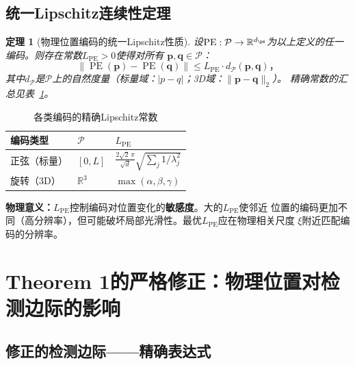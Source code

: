 \documentclass[11pt,a4paper]{article}
\newtheorem{theorem}{定理}[section]
\theoremstyle{remark}
\DeclareMathOperator{\PE}{PE}
\newcommand{\R}{\mathbb{R}}
\newcommand{\Ppos}{\mathcal{P}}
\begin{document}
\subsection{统一Lipschitz连续性定理}

\begin{theorem}[物理位置编码的统一Lipschitz性质]
\label{thm:1.4.1}
设$\PE: \Ppos \to \R^{d_{\pe}}$为以上定义的任一编码。则存在常数$L_{\PE} > 0$使得对所有
$\mathbf{p}, \mathbf{q} \in \Ppos$：
\begin{equation}
    \boxed{
    \|\PE(\mathbf{p}) - \PE(\mathbf{q})\| \leq L_{\PE} \cdot d_{\Ppos}(\mathbf{p}, \mathbf{q})
    }，
\end{equation}
其中$d_{\Ppos}$是$\Ppos$上的自然度量（标量域：$|p-q|$；3D域：$\|\mathbf{p} - \mathbf{q}\|_2$）。
精确常数的汇总见表~\ref{tab:lipschitz}。
\end{theorem}

\begin{table}[htbp]
\centering
\caption{各类编码的精确Lipschitz常数}
\label{tab:lipschitz}
\begin{tabular}{@{}lll@{}}
\toprule
\textbf{编码类型} & $\Ppos$ & $L_{\PE}$ \\
\midrule
正弦（标量） & $[0, L]$ & $\frac{2\sqrt{2}\,\pi}{\sqrt{d}}\sqrt{\sum_j 1/\lambda_j^2}$ \\
旋转（3D） & $\R^3$ & $\max(\alpha, \beta, \gamma)$ \\
\bottomrule
\end{tabular}
\end{table}

\textbf{物理意义：}$L_{\PE}$控制编码对位置变化的\textbf{敏感度}。大的$L_{\PE}$使邻近
位置的编码更加不同（高分辨率），但可能破坏局部光滑性。最优$L_{\PE}$应在物理相关尺度
$\xi$附近匹配编码的分辨率。

\section{Theorem 1的严格修正：物理位置对检测边际的影响}

\subsection{修正的检测边际——精确表达式}
\end{document}
